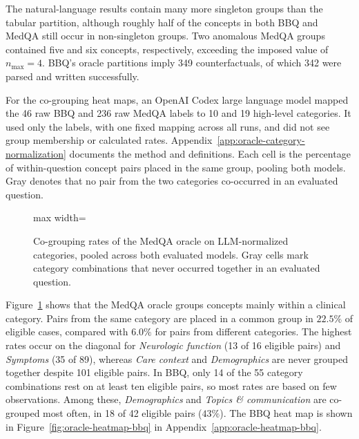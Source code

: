 The natural-language results contain many more singleton groups than the tabular partition, although roughly half of the concepts in both BBQ and MedQA still occur in non-singleton groups. Two anomalous MedQA groups contained five and six concepts, respectively, exceeding the imposed value of $n_{\max}=4$. BBQ's oracle partitions imply 349 counterfactuals, of which 342 were parsed and written successfully.

For the co-grouping heat maps, an OpenAI Codex large language model mapped the 46 raw BBQ and 236 raw MedQA labels to 10 and 19 high-level categories. It used only the labels, with one fixed mapping across all runs, and did not see group membership or calculated rates. Appendix~\ref{app:oracle-category-normalization} documents the method and definitions. Each cell is the percentage of within-question concept pairs placed in the same group, pooling both models. Gray denotes that no pair from the two categories co-occurred in an evaluated question.

\begin{figure}[htb]
  \centering
  \begin{adjustbox}{max width=\textwidth}
    \OracleHeatmapMedQA
  \end{adjustbox}
  \caption[Oracle co-grouping rates for MedQA]{Co-grouping rates of the MedQA oracle on LLM-normalized categories, pooled across both evaluated models. Gray cells mark category combinations that never occurred together in an evaluated question.}
  \label{fig:oracle-heatmap-medqa}
\end{figure}

Figure~\ref{fig:oracle-heatmap-medqa} shows that the MedQA oracle groups concepts mainly within a clinical category. Pairs from the same category are placed in a common group in $22.5\%$ of eligible cases, compared with $6.0\%$ for pairs from different categories. The highest rates occur on the diagonal for \textit{Neurologic function} (13 of 16 eligible pairs) and \textit{Symptoms} (35 of 89), whereas \textit{Care context} and \textit{Demographics} are never grouped together despite 101 eligible pairs. In BBQ, only 14 of the 55 category combinations rest on at least ten eligible pairs, so most rates are based on few observations. Among these, \textit{Demographics} and \textit{Topics \& communication} are co-grouped most often, in 18 of 42 eligible pairs ($43\%$). The BBQ heat map is shown in Figure~\ref{fig:oracle-heatmap-bbq} in Appendix~\ref{app:oracle-heatmap-bbq}.

